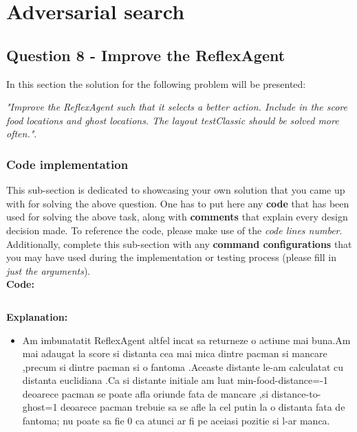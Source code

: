 \section{Adversarial search}

\subsection{Question 8 - Improve the ReflexAgent}
In this section the solution for the following problem will be presented: \newline

\textit{"Improve the ReflexAgent such that it selects a better action. Include in the score food locations and ghost locations. The layout testClassic should be solved more often."}.


\subsubsection{Code implementation}
This sub-section is dedicated to showcasing your own solution that you came up with for solving the above question. One has to put here any \textbf{code} that has been used for solving the above task, along with \textbf{comments} that explain every design decision made. To reference the code, please make use of the \textit{code lines number}. Additionally, complete this sub-section with any \textbf{command configurations} that you may have used during the implementation or testing process (please fill in \textit{just the arguments}). \\

\textbf{Code:}

\inputminted[linenos]{python}{code/08_reflex_agent.py}


\textbf{Explanation:}
\begin{itemize}
    \setlength\itemsep{0em}
    \item Am imbunatatit ReflexAgent altfel incat sa returneze o actiune mai buna.Am mai adaugat la score si distanta cea mai mica dintre pacman si mancare ,precum si  dintre pacman si o fantoma .Aceaste distante le-am calculatat cu distanta euclidiana .Ca si distante initiale am luat min-food-distance=-1  deoarece pacman se poate afla oriunde fata de mancare ,si distance-to-ghost=1 deoarece pacman trebuie sa se afle la cel putin la  o distanta fata de fantoma; nu poate sa fie 0 ca atunci ar fi pe aceiasi pozitie si l-ar manca.

\end{itemize}


